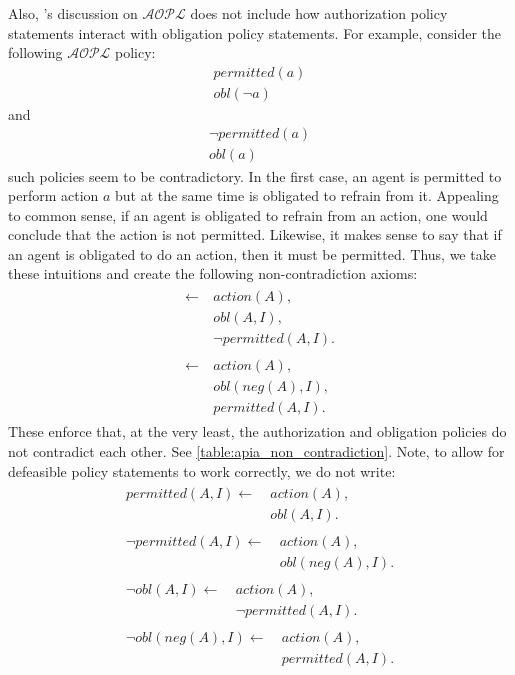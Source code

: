 Also, \citet{gelfond_authorization_2008}'s discussion on $\mathcal{AOPL}$ does not include how authorization policy statements interact with obligation policy statements.
For example, consider the following $\mathcal{AOPL}$ policy:
\begin{gather}
    permitted(a) \\
    obl(\neg a)
\end{gather}
and
\begin{gather}
    \neg permitted(a) \\
    obl(a)
\end{gather}
such policies seem to be contradictory.
In the first case, an agent is permitted to perform action $a$ but at the same time is obligated to refrain from it.
Appealing to common sense, if an agent is obligated to refrain from an action, one would conclude that the action is not permitted.
Likewise, it makes sense to say that if an agent is obligated to do an action, then it must be permitted.
Thus, we take these intuitions and create the following non-contradiction axioms:
\begin{gather}
    \begin{split}
        \leftarrow \
            & action(A), \\
            & obl(A, I), \\
            & \neg permitted(A, I).
    \end{split} \\
    \begin{split}
        \leftarrow \
            & action(A), \\
            & obl(neg(A), I), \\
            & permitted(A, I).
    \end{split}
\end{gather}
These enforce that, at the very least, the authorization and obligation policies do not contradict each other.
See \cref{table:apia_non_contradiction}.
Note, to allow for defeasible policy statements to work correctly, we do not write:
\begin{gather}
    \begin{split}
        permitted(A, I) \leftarrow \
            & action(A), \\
            & obl(A, I).
    \end{split} \\
    \begin{split}
        \neg permitted(A, I) \leftarrow \
            & action(A), \\
            & obl(neg(A), I).
    \end{split} \\
    \begin{split}
        \neg obl(A, I) \leftarrow \
            & action(A), \\
            & \neg permitted(A, I).
    \end{split} \\
    \begin{split}
        \neg obl(neg(A), I) \leftarrow \
            & action(A), \\
            & permitted(A, I).
    \end{split}
\end{gather}

